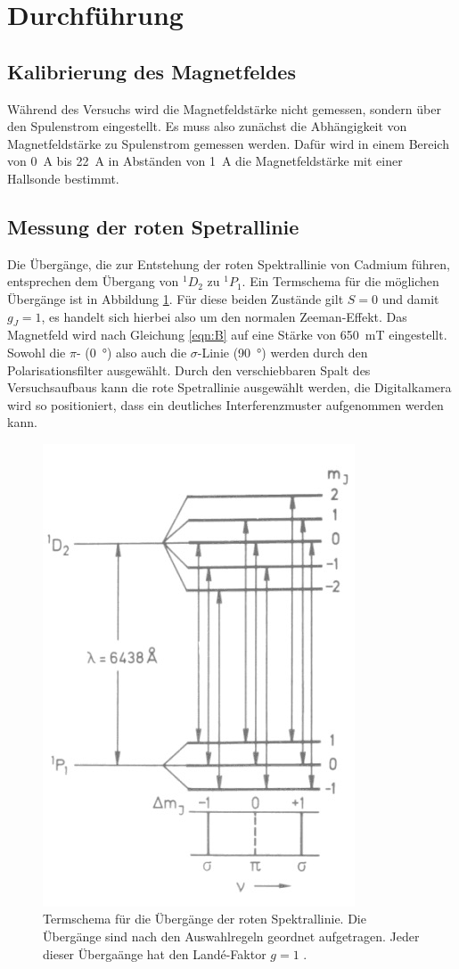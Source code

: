 \section{Durchführung}
\subsection{Kalibrierung des Magnetfeldes}
Während des Versuchs wird die Magnetfeldstärke nicht gemessen, sondern über den Spulenstrom eingestellt.
Es muss also zunächst die Abhängigkeit von Magnetfeldstärke zu Spulenstrom gemessen werden.
Dafür wird in einem Bereich von \SI{0}{\ampere} bis \SI{22}{\ampere} in Abständen von \SI{1}{\ampere} die Magnetfeldstärke mit einer Hallsonde bestimmt.

\subsection{Messung der roten Spetrallinie}

Die Übergänge, die zur Entstehung der roten Spektrallinie von Cadmium führen, entsprechen dem Übergang von $^1D_2$ zu $^1P_1$.
Ein Termschema für die möglichen Übergänge ist in Abbildung \ref{fig:Term_rot}.
Für diese beiden Zustände gilt $S=0$ und damit $g_J = 1$, es handelt sich hierbei also um den normalen Zeeman-Effekt.
Das Magnetfeld wird nach Gleichung \eqref{eqn:B} auf eine Stärke von \SI{650}{\milli\tesla} eingestellt.
Sowohl die $\pi$- (\SI{0}{\degree}) also auch die $\sigma$-Linie (\SI{90}{\degree}) werden durch den Polarisationsfilter ausgewählt.
Durch den verschiebbaren Spalt des Versuchsaufbaus kann die rote Spetrallinie ausgewählt werden, die Digitalkamera wird so positioniert, dass ein deutliches Interferenzmuster aufgenommen werden kann.

\begin{figure}[H]
  \centering
  \includegraphics[width = .4\textwidth]{images/Termschema_rot_TUbes.jpg}
  \caption{Termschema für die Übergänge der roten Spektrallinie. Die Übergänge sind nach den Auswahlregeln geordnet aufgetragen. Jeder dieser Übergaänge hat den Landé-Faktor $g=1$ \cite{WWW}.}
  \label{fig:Term_rot}
\end{figure}

